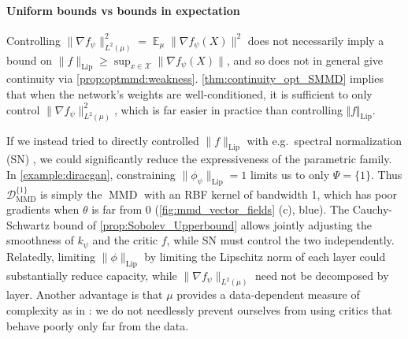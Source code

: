 \documentclass{article}
\DeclareMathOperator{\E}{\mathbb E}
\newcommand{\x}{\mathcal X}
\newcommand{\lip}{\mathrm{Lip}}
\DeclareMathOperator{\MMD}{MMD}
\newcommand{\optMMD}[1][\Psi]{\operatorname{\mathcal D_{\mathrm{MMD}}^{#1}}}
\let\citep\parencite
\begin{document}
\paragraph{Uniform bounds vs bounds in expectation}
Controlling $\lVert \nabla f_\psi \rVert_{L^2(\mu)}^2 = \E_\mu \lVert \nabla f_\psi(X) \rVert^2$
does not necessarily imply a bound on $\lVert f \rVert_\lip \ge \sup_{x \in \x} \lVert \nabla f_\psi(X) \rVert$,
and so does not in general give continuity via \cref{prop:optmmd:weakness}.
\cref{thm:continuity_opt_SMMD} implies that when the network's weights are well-conditioned,
it is sufficient to only control $\lVert \nabla f_\psi \rVert_{L^2(\mu)}^2$,
which is far easier in practice than controlling $\Vert f\Vert_\lip$.


If we instead tried to directly controlled $\lVert f \rVert_\lip$ with e.g.\ spectral normalization (SN) \citep{Miyato:2018},
we could significantly reduce the expressiveness of the parametric family.
In \cref{example:diracgan},
constraining $\lVert \phi_\psi \rVert_\lip = 1$ limits us to only $\Psi = \{ 1 \}$.
Thus $\optMMD[\{1\}]$ is simply the $\MMD$ with an RBF kernel of bandwidth 1,
which has poor gradients when $\theta$ is far from $0$ (\cref{fig:mmd_vector_fields} (c), blue).
The Cauchy-Schwartz bound of \cref{prop:Sobolev_Upperbound}
allows jointly adjusting the smoothness of $k_\psi$ and the critic $f$,
while SN must control the two independently.
Relatedly, limiting $\lVert \phi \rVert_\lip$ by limiting the Lipschitz norm of each layer
could substantially reduce capacity,
while $\lVert \nabla f_\psi \rVert_{L^2(\mu)}$ need not be decomposed by layer.
Another advantage is that $\mu$ provides a data-dependent measure of complexity as in \cite{Bousquet:2004}:
we do not needlessly prevent ourselves from using critics that behave poorly only far from the data.
\end{document}
